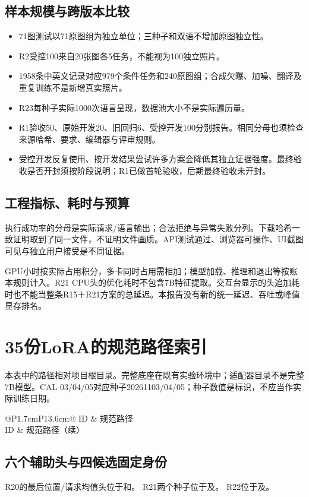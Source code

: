 \documentclass[UTF8,fontset=none,zihao=5,a4paper]{ctexart}
\renewcommand{\arraystretch}{1.3}
\begin{document}
\subsection{样本规模与跨版本比较}
\begin{itemize}
\item 71图测试以71原图组为独立单位；三种子和双语不增加原图独立性。
\item R2受控100来自20张图各5任务，不能视为100独立照片。
\item 1958条中英文记录对应979个条件任务和240原图组；合成欠曝、加噪、翻译及重复训练不是新增真实照片。
\item R23每种子实际1000次语言呈现，数据池大小不是实际遍历量。
\item R1验收50、原始开发20、旧回归6、受控开发100分别报告。相同分母也须检查来源哈希、要求、编辑器与评审规则。
\item 受控开发反复使用、按开发结果尝试许多方案会降低其独立证据强度。最终验收是否开封须按阶段说明；R1已做首轮验收，后期最终验收未开封。
\end{itemize}

\subsection{工程指标、耗时与预算}
执行成功率的分母是实际请求/语言输出；合法拒绝与异常失败分列。下载哈希一致证明取到了同一文件，不证明文件画质。API测试通过、浏览器可操作、UI截图可见与独立用户接受是不同证据。

GPU小时按实际占用积分，多卡同时占用需相加；模型加载、推理和退出等按账本规则计入。R21 CPU头的优化耗时不包含7B特征提取。交互台显示的头追加耗时也不能当整条R15＋R21方案的总延迟。本报告没有新的统一延迟、吞吐或峰值显存排名。
\clearpage

\section{35份LoRA的规范路径索引}
\noindent 本表中的路径相对项目根目录。完整底座在既有实验环境中；适配器目录不是完整7B模型。CAL-03/04/05对应种子20261103/04/05；种子数值是标识，不应当作实际训练日期。
{\footnotesize
\renewcommand{\arraystretch}{1.15}
\begin{longtable}{@{}P{1.7cm}P{13.6cm}@{}}
\toprule ID & 规范路径\\\midrule\endfirsthead
\toprule ID & 规范路径（续）\\\midrule\endhead
\bottomrule\endfoot
\InventoryRows
\end{longtable}}

\subsection{六个辅助头与四候选固定身份}
R20的最后位置/请求均值头位于和。
R21两个种子位于及。
R22位于及。
\end{document}
